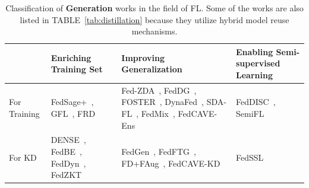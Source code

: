 \begin{table}[t]
  \centering
  \tiny
  \caption{Classification of \textbf{Generation} works in the field of FL. Some of the works are also listed in TABLE~\ref{tab:distillation} because they utilize hybrid model reuse mechanisms.}
  \label{tab:generation}

  \begin{tabular}{|l|p{2.1cm}|p{2.3cm}|p{1.45cm}|}
    \hline
    & Enriching Training Set & Improving Generalization  & Enabling Semi-supervised Learning  \\ \hline
   
    \multicolumn{1}{|l|}{For Training} & FedSage+~\cite{zhang2021subgraph}, GFL~\cite{cheng2023gfl}, \newline FRD~\cite{cha2019federated} & Fed-ZDA~\cite{hao2021towards}, FedDG~\cite{liu2021feddg}, FOSTER~\cite{yu2023turning}, DynaFed~\cite{pi2023dynafed}, SDA-FL~\cite{liz2022federated}, FedMix~\cite{yoon2021fedmix}, \newline FedCAVE-Ens~\cite{heinbaugh2023data} & FedDISC~\cite{yang2023exploring}, \newline SemiFL~\cite{diao2022semifl}  \\ \hline

    \multicolumn{1}{|l|}{For KD} & DENSE~\cite{zhang2022dense}, FedBE~\cite{chen2020fedbe}, \newline FedDyn~\cite{jin2023feddyn}, FedZKT~\cite{zhang2022fedzkt} & FedGen~\cite{zhu2021data}, FedFTG~\cite{zhang2022fine}, FD+FAug~\cite{jeong2018communication}, FedCAVE-KD~\cite{heinbaugh2023data} & FedSSL~\cite{fan2022private} \\ \hline
  \end{tabular}
\end{table}



